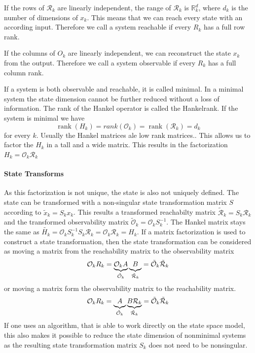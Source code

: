 \documentclass[doctype=mastersthesis,BCOR=15mm,biblatex]{ldvbook}%
\DeclareMathOperator{\rank}{rank}
\newcommand{\R}{\mathcal{R}} %
\newcommand{\Ob}{\mathcal{O}} %
\begin{document}
If the rows of $\R_k$ are linearly independent, the range of $\R_k$ is $\mathbb{R}^d_k$, where $d_k$ is the number of dimensions of $x_k$.
This means that we can reach every state with an according input.
Therefore we call a system reachable if every $R_k$ has a full row rank.

If the columns of $O_k$ are linearly independent, we can reconstruct the state $x_k$ from the output.  
Therefore we call a system observable if every $R_k$ has a full column rank.

If a system is both observable and reachable, it is called minimal.
In a minimal system the state dimension cannot be further reduced without a loss of information.
The rank of the Hankel operator is called the Hankelrank. 
If the system is minimal we have 
\begin{equation}
	\rank(H_k) = rank(\Ob_k) = \rank(\R_k) = d_k
\end{equation}
for every $k$.
Usually the Hankel matrices ale low rank matrices..
This allows us to factor the $H_k$ in a tall and a wide matrix. 
This results in the factorization $H_k = \Ob_k\R_k$

\paragraph{State Transforms}
As this factorization is not unique, the state is also not uniquely defined. 
The state can be transformed with a non-singular state transformation matrix $S$ according to $\tilde{x}_k =S_kx_k$.
This results a transformed 
reachabilty matrix $\tilde{\R}_k=S_k \R_k$ and the transformed
observability matrix $\tilde{\Ob}_k= \Ob_k S_k^{-1}$. 
The Hankel matrix stays the same as $\tilde{H_k} = \Ob_k S_k^{-1} S_k \R_k= \Ob_k \R_k = H_k$.
If a matrix factorization is used to construct a state transformation, then the state transformation can be considered as moving a matrix from the reachability matrix to the observability matrix
\begin{equation}
	\Ob_{k}R_{k} = \underbrace{\Ob_{k}A}_{\tilde{\Ob}_k}\underbrace{B\vphantom{\Ob_k}}_{\tilde{\R}_k} = \tilde{\Ob}_k\tilde{\R}_k
\end{equation}
or moving a matrix form the observability matrix to the reachability matrix.
\begin{equation}
\Ob_{k}R_{k} = \underbrace{A\vphantom{\R_k}}_{\tilde{\Ob}_k}\underbrace{B\R_{k}}_{\tilde{\R}_k} = \tilde{\Ob}_k\tilde{\R}_k
\end{equation}
If one uses an algorithm, that is able to work directly on the state space model, this also makes it possible to reduce the state dimension of nonminimal systems as the resulting state transformation matrix $S_k$ does not need to be nonsingular.
\end{document}
